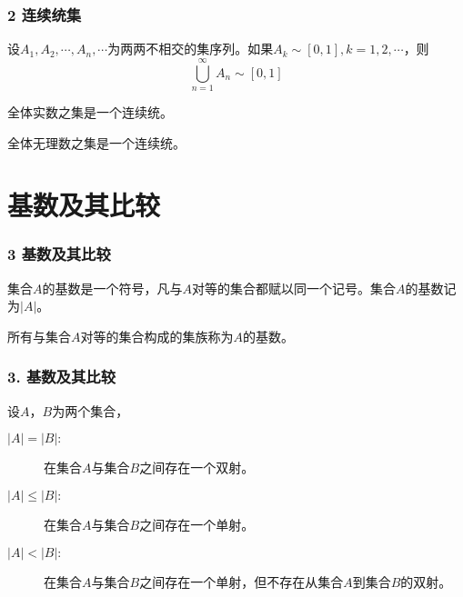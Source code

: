 \documentclass{beamer}
\begin{document}
\begin{CJK*}{UTF8}{gbsn}
\begin{frame}
  \frametitle{2 连续统集}
  \begin{Thm}
    设$A_1, A_2, \cdots, A_n, \cdots$为两两不相交的集序列。如果$A_k \sim [0,1], k = 1, 2, \cdots$，则
    \[\bigcup_{n=1}^{\infty}A_n \sim [0,1]\]
  \end{Thm}
  \begin{Cor}
    全体实数之集是一个连续统。
  \end{Cor}
  \begin{Cor}
    全体无理数之集是一个连续统。
  \end{Cor}
\end{frame}


\section{基数及其比较}
\begin{frame}
  \frametitle{3 基数及其比较}
  \begin{Def}
    集合$A$的基数是一个符号，凡与$A$对等的集合都赋以同一个记号。集合$A$的基数记为$|A|$。
  \end{Def}
  \begin{Def}
    所有与集合$A$对等的集合构成的集族称为$A$的基数。
  \end{Def}
\end{frame}
\begin{frame}
  \frametitle{3. 基数及其比较}
  设$A$，$B$为两个集合，
  \begin{description}
  \item[$|A|=|B|:$]在集合$A$与集合$B$之间存在一个双射。
  \item[$|A|\leq |B|:$]在集合$A$与集合$B$之间存在一个单射。
  \item[$|A|< |B|:$]在集合$A$与集合$B$之间存在一个单射，但不存在从集合$A$到集合$B$的双射。
  \end{description}
\end{frame}


\end{CJK*}
\end{document}
